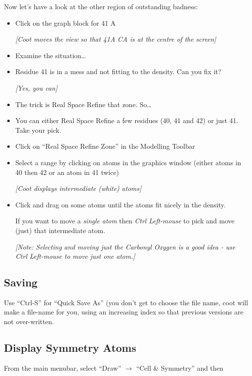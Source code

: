 \documentclass{article}
\begin{document}
Now let's have a look at the other region of outstanding badness:
\begin{itemize}
\item Click on the graph block for 41 A

\textsl{ [\emph{Coot} moves the view so that 41A CA is at the centre of the screen]}

\item Examine the situation\ldots
\item Residue 41 is in a mess and not fitting to the density.  Can you
  fix it?

  \emph{ [Yes, you can] }
\item The trick is Real Space Refine that zone. So\ldots
\item You can either Real Space Refine a few residues (40, 41 and 42)
  or just 41.  Take your pick.
\item Click on \textsf{``Real Space Refine Zone''} in the
  Modelling Toolbar
\item Select a range by clicking on atoms in the graphics window
  (either atoms in 40 then 42 or an atom in 41 twice)

\textsl{[\emph{Coot} displays intermediate (white) atoms]}

\item Click and drag on some atoms until the atoms fit nicely in the
  density.

  If you want to move a \emph{single atom} then \emph{Ctrl Left-mouse}
  to pick and move (just) that intermediate atom.

  \emph{[Note: Selecting and moving just the Carbonyl Oxygen is a
    good idea - use Ctrl Left-mouse to move just one atom.]}

\end{itemize}

\subsection{Saving}

Use ``Ctrl-S'' for ``Quick Save As'' (you don't get to choose the file
name, coot will make a file-name for you, using an increasing index so
that previous versions are not over-written.


\subsection{Display Symmetry Atoms}

From the main menubar, select \textsf{``Draw'' $\rightarrow$ ``Cell \& Symmetry''}
and then
\end{document}
